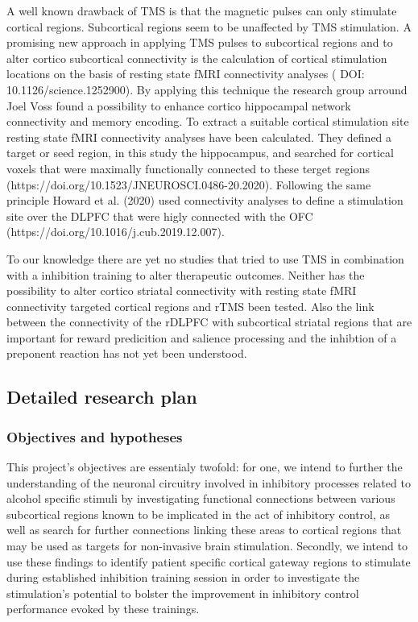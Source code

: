 \documentclass[12pt]{article}
\begin{document}
A well known drawback of TMS is that the magnetic pulses can only stimulate cortical regions. Subcortical regions seem to be unaffected by TMS stimulation. A promising new approach in applying TMS pulses to subcortical regions and to alter cortico subcortical connectivity is the calculation of cortical stimulation locations on the basis of resting state fMRI connectivity analyses (
DOI: 10.1126/science.1252900). By applying this technique the research group arround Joel Voss found a possibility to enhance cortico hippocampal network connectivity and memory encoding. To extract a suitable cortical stimulation site resting state fMRI connectivity analyses have been calculated. They defined a target or seed region, in this study the hippocampus, and searched for cortical voxels that were maximally functionally connected to these terget regions (https://doi.org/10.1523/JNEUROSCI.0486-20.2020). Following the same principle Howard et al. (2020) used connectivity analyses to define a stimulation site over the DLPFC that were higly connected with the OFC (https://doi.org/10.1016/j.cub.2019.12.007). 

To our knowledge there are yet no studies that tried to use TMS in combination with a inhibition training to alter therapeutic outcomes. Neither has the possibility to alter cortico striatal connectivity with resting state fMRI connectivity targeted cortical regions and rTMS been tested. Also the link between the connectivity of the rDLPFC with subcortical striatal regions that are important for reward predicition and salience processing and the inhibtion of a preponent reaction has not yet been understood. 

\subsection{Detailed research plan}


\subsubsection{Objectives and hypotheses}

This project's objectives are essentialy twofold: for one, we intend to further the understanding of the neuronal circuitry involved in inhibitory processes related to alcohol specific stimuli by investigating functional connections between various subcortical regions known to be implicated in the act of inhibitory control, as well as search for further connections linking these areas to cortical regions that may be used as targets for non-invasive brain stimulation. Secondly, we intend to use these findings to identify patient specific cortical gateway regions to stimulate during established inhibition training session in order to investigate the stimulation's potential to bolster the improvement in inhibitory control performance evoked by these trainings.
\end{document}
